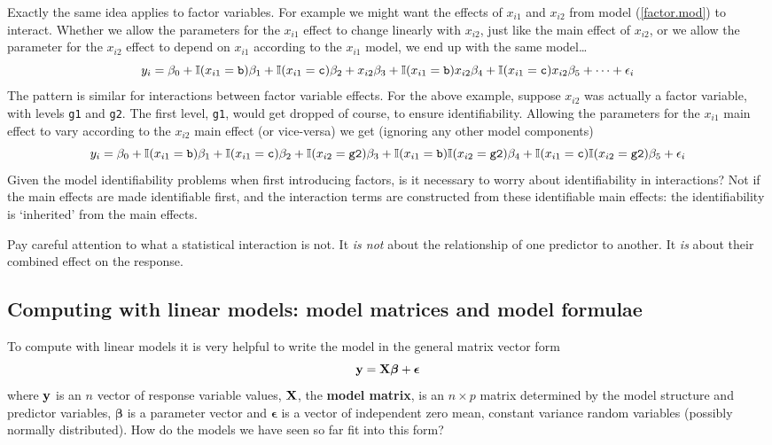 \documentclass[10pt] {article}
\theoremstyle{definition}
\begin{document}
Exactly the same idea applies to factor variables. For example we might want the effects of $x_{i1}$ and $x_{i2}$ from model (\ref{factor.mod}) to interact. Whether we allow the parameters for the  $x_{i1}$ effect to change linearly with $x_{i2}$, just like the main effect of  $x_{i2}$, or we allow the parameter for the $x_{i2}$ effect to depend on $x_{i1}$ according to the $x_{i1}$ model, we end up with the same model\ldots
$$
y_i = \beta_0  + \mathbb{I}(x_{i1}={\tt b})\beta_1 + \mathbb{I}(x_{i1}={\tt c})\beta_2 + x_{i2} \beta_3 
+ \mathbb{I}(x_{i1}={\tt b})x_{i2} \beta_4 + \mathbb{I}(x_{i1}={\tt c})x_{i2}  \beta_5 +
 \cdots + \epsilon_i
$$  
The pattern is similar for interactions between factor variable effects. For the above example, suppose $x_{i2}$ was actually a factor variable, with levels \verb+g1+ and \verb+g2+. The first level, \verb+g1+, would get dropped of course, to ensure identifiability. Allowing the parameters for the  $x_{i1}$ main effect to vary according to the $x_{i2}$ main effect (or vice-versa) we get (ignoring any other model components)
$$
y_i = \beta_0  + \mathbb{I}(x_{i1}={\tt b})\beta_1 + \mathbb{I}(x_{i1}={\tt c})\beta_2 + \mathbb{I}(x_{i2}={\tt g2}) \beta_3 
+ \mathbb{I}(x_{i1}={\tt b})\mathbb{I}(x_{i2}={\tt g2}) \beta_4 + \mathbb{I}(x_{i1}={\tt c})\mathbb{I}(x_{i2}={\tt g2})  \beta_5 + \epsilon_i
$$ 
Given the model identifiability problems when first introducing factors, is it necessary to worry about identifiability in interactions? Not if the main effects are made identifiable first, and the interaction terms are constructed from these identifiable main effects: the identifiability is `inherited' from the main effects.   

Pay careful attention to what a statistical interaction is not. It {\em is not} about the relationship of one predictor to another. It {\em is} about their combined effect on the response.


\subsection{Computing with linear models: model matrices and model formulae \label{sec:model.matrix}}

To compute with linear models it is very helpful to write the model in the general matrix vector form
$$
{\bf y} = {\bf X}{\bm \beta} + {\bm \epsilon}
$$
where ${\bf y}$ is an $n$ vector of response variable values, $\bf X$, the {\bf model matrix}, is an $n \times p$ matrix determined by the model structure and predictor variables, $\bm \beta$ is a parameter vector and ${\bm \epsilon}$ is a vector of independent zero mean, constant variance random variables (possibly normally distributed). How do the models we have seen so far fit into this form?
\end{document}
